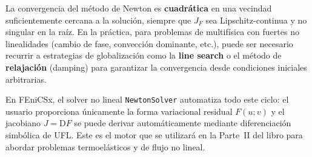La convergencia del método de Newton es \textbf{cuadrática} en una vecindad suficientemente cercana a la solución, siempre que $J_F$ sea Lipschitz-continua y no singular en la raíz. En la práctica, para problemas de multifísica con fuertes no linealidades (cambio de fase, convección dominante, etc.), puede ser necesario recurrir a estrategias de globalización como la \textbf{line search} o el método de \textbf{relajación} (damping) para garantizar la convergencia desde condiciones iniciales arbitrarias.

\begin{notatecnica}
En FEniCSx, el solver no lineal \texttt{NewtonSolver} automatiza todo este ciclo: el usuario proporciona únicamente la forma variacional residual $F(u; v)$ y el jacobiano $J = \mathrm{D}F$ se puede derivar automáticamente mediante diferenciación simbólica de UFL. Este es el motor que se utilizará en la Parte~II del libro para abordar problemas termoelásticos y de flujo no lineal.
\end{notatecnica}
